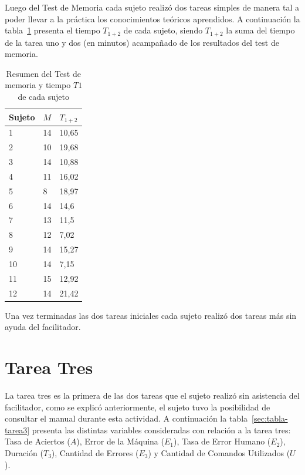 Luego del Test de Memoria cada sujeto realiz\'o dos tareas simples de manera tal a poder 
llevar a la pr\'actica los conocimientos te\'oricos aprendidos.
A continuaci\'on la tabla~\ref{sec:tabla-t1-memoria} presenta el tiempo $T_{1+2}$ de
cada sujeto, siendo $T_{1+2}$ la suma del tiempo de la tarea uno y dos (en minutos) acampa\~nado
de los resultados del test de memoria.

\begin{table}[H]
\centering
\footnotesize
\begin{tabular}{|p{1.6cm}|p{1.6cm}|p{1.6cm}|}
\hline
    Sujeto & $M$ & $T_{1+2}$ \\
    \hline 
    1 & 14 & 10,65 \\
    2 & 10 & 19,68 \\
    3 & 14 & 10,88 \\
    4 & 11 & 16,02 \\
    5 & 8 & 18,97 \\
    6 & 14 & 14,6 \\
    7 & 13 & 11,5 \\
    8 & 12 & 7,02 \\
    9 & 14 & 15,27 \\
    10 & 14 & 7,15 \\
    11 & 15 & 12,92 \\
    12 & 14 & 21,42 \\
\hline
\end{tabular}
\caption{Resumen del Test de memoria y tiempo $T1$ de cada sujeto}
\label{sec:tabla-t1-memoria}
\end{table}

Una vez terminadas las dos tareas iniciales cada sujeto realiz\'o dos tareas m\'as sin ayuda del facilitador.

\section{Tarea Tres}

La tarea tres es la primera de las dos tareas que el sujeto realiz\'o sin asistencia del facilitador, como
se explic\'o anteriormente, el sujeto tuvo la posibilidad de consultar el manual durante esta actividad.
A continuaci\'on la tabla~\ref{sec:tabla-tarea3} presenta las distintas variables consideradas con relaci\'on
a la tarea tres: Tasa de Aciertos ($A$), Error de la M\'aquina ($E_1$),  
Tasa de Error Humano ($E_2$), Duraci\'on ($T_3$), Cantidad de Errores ($E_3$) y Cantidad de Comandos Utilizados ($U$).

